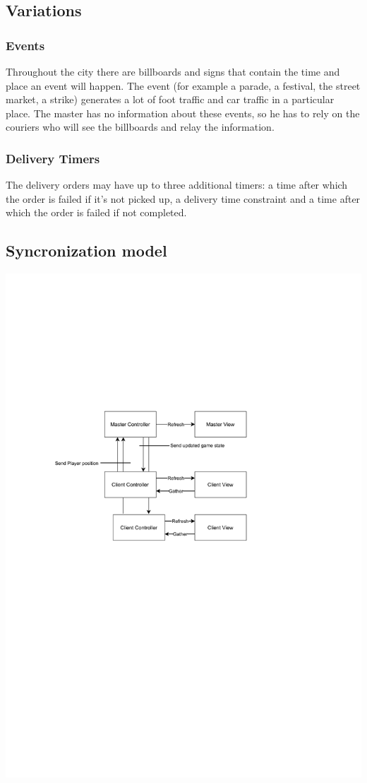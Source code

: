 \documentclass{article}
\begin{document}
\subsection{Variations}
\subsubsection{Events}
Throughout the city there are billboards and signs that contain the time and place an event will happen. The event (for example a parade, a festival, the street market, a strike) generates a lot of foot traffic and car traffic in a particular place. The master has no information about these events, so he has to rely on the couriers who will see the billboards and relay the information.
\subsubsection{Delivery Timers}
The delivery orders may have up to three additional timers: a time after which the order is failed if it's not picked up, a delivery time constraint and a time after which the order is failed if not completed.
\subsection{Syncronization model}
\includegraphics[width=\textwidth]{net architecture}
\end{document}
